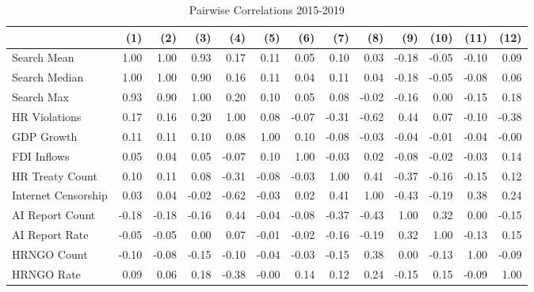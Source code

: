 \begin{table}[ht]
\centering
\begin{tabular}{|l|rrrrrrrrrrrr|}
  \hline
 & (1) & (2) & (3) & (4) & (5) & (6) & (7) & (8) & (9) & (10) & (11) & (12) \\ 
  \hline
Search Mean & 1.00 & 1.00 & 0.93 & 0.17 & 0.11 & 0.05 & 0.10 & 0.03 & -0.18 & -0.05 & -0.10 & 0.09 \\ 
  Search Median & 1.00 & 1.00 & 0.90 & 0.16 & 0.11 & 0.04 & 0.11 & 0.04 & -0.18 & -0.05 & -0.08 & 0.06 \\ 
  Search Max & 0.93 & 0.90 & 1.00 & 0.20 & 0.10 & 0.05 & 0.08 & -0.02 & -0.16 & 0.00 & -0.15 & 0.18 \\ 
  HR Violations & 0.17 & 0.16 & 0.20 & 1.00 & 0.08 & -0.07 & -0.31 & -0.62 & 0.44 & 0.07 & -0.10 & -0.38 \\ 
  GDP Growth & 0.11 & 0.11 & 0.10 & 0.08 & 1.00 & 0.10 & -0.08 & -0.03 & -0.04 & -0.01 & -0.04 & -0.00 \\ 
  FDI Inflows & 0.05 & 0.04 & 0.05 & -0.07 & 0.10 & 1.00 & -0.03 & 0.02 & -0.08 & -0.02 & -0.03 & 0.14 \\ 
  HR Treaty Count & 0.10 & 0.11 & 0.08 & -0.31 & -0.08 & -0.03 & 1.00 & 0.41 & -0.37 & -0.16 & -0.15 & 0.12 \\ 
  Internet Censorship & 0.03 & 0.04 & -0.02 & -0.62 & -0.03 & 0.02 & 0.41 & 1.00 & -0.43 & -0.19 & 0.38 & 0.24 \\ 
  AI Report Count & -0.18 & -0.18 & -0.16 & 0.44 & -0.04 & -0.08 & -0.37 & -0.43 & 1.00 & 0.32 & 0.00 & -0.15 \\ 
  AI Report Rate & -0.05 & -0.05 & 0.00 & 0.07 & -0.01 & -0.02 & -0.16 & -0.19 & 0.32 & 1.00 & -0.13 & 0.15 \\ 
  HRNGO Count & -0.10 & -0.08 & -0.15 & -0.10 & -0.04 & -0.03 & -0.15 & 0.38 & 0.00 & -0.13 & 1.00 & -0.09 \\ 
  HRNGO Rate & 0.09 & 0.06 & 0.18 & -0.38 & -0.00 & 0.14 & 0.12 & 0.24 & -0.15 & 0.15 & -0.09 & 1.00 \\ 
   \hline
\end{tabular}
\caption{Pairwise Correlations 2015-2019} 
\end{table}
